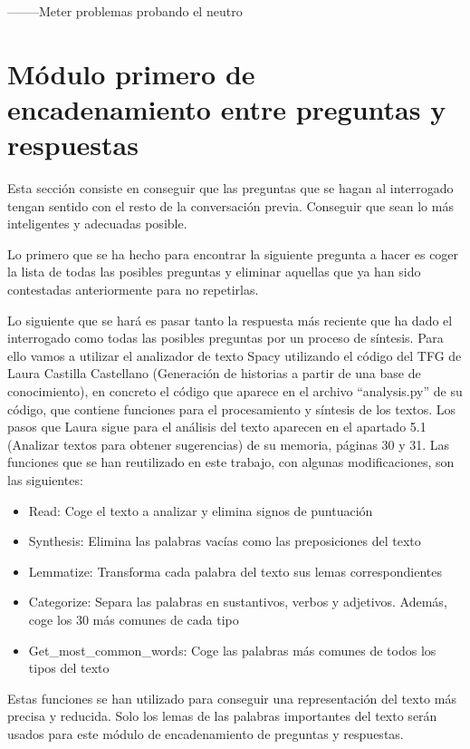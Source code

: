 --------Meter problemas probando el neutro

\section{Módulo primero de encadenamiento entre preguntas y respuestas}
Esta sección consiste en conseguir que las preguntas que se hagan al interrogado tengan sentido con el resto de la conversación previa. Conseguir que sean lo más inteligentes y adecuadas posible. 

Lo primero que se ha hecho para encontrar la siguiente pregunta a hacer es coger la lista de todas las posibles preguntas y eliminar aquellas que ya han sido contestadas anteriormente para no repetirlas. 

Lo siguiente que se hará es pasar tanto la respuesta más reciente que ha dado el interrogado como todas las posibles preguntas por un proceso de síntesis. Para ello vamos a utilizar el analizador de texto Spacy utilizando el código del TFG de Laura Castilla Castellano (Generación de historias a partir de una base de conocimiento), en concreto el código que aparece en el archivo ``analysis.py'' de su código, que contiene funciones para el procesamiento y síntesis de los textos. Los pasos que Laura sigue para el análisis del texto aparecen en el apartado 5.1 (Analizar textos para obtener sugerencias) de su memoria, páginas 30 y 31. Las funciones que se han reutilizado en este trabajo, con algunas modificaciones, son las siguientes:
\begin{itemize}
	\item Read: Coge el texto a analizar y elimina signos de puntuación
	\item Synthesis: Elimina las palabras vacías como las preposiciones del texto
	\item Lemmatize: Transforma cada palabra del texto sus lemas correspondientes
	\item Categorize: Separa las palabras en sustantivos, verbos y adjetivos. Además, coge los 30 más comunes de cada tipo
	\item Get\_most\_common\_words: Coge las palabras más comunes de todos los tipos del texto
\end{itemize}

Estas funciones se han utilizado para conseguir una representación del texto más precisa y reducida. Solo los lemas de las palabras importantes del texto serán usados para este módulo de encadenamiento de preguntas y respuestas.

